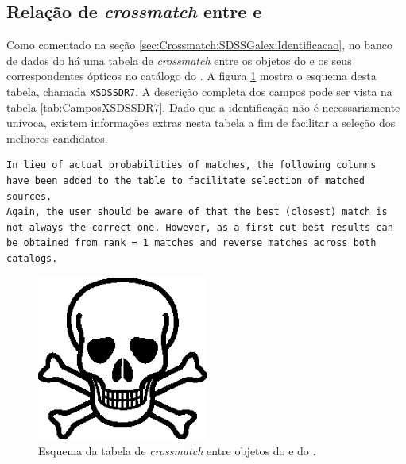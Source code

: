 \subsection{Relação de {\em crossmatch} entre \SDSS e \galex}
Como comentado na seção \ref{sec:Crossmatch:SDSSGalex:Identificacao}, no banco
de dados do \galex há uma tabela de {\em crossmatch} entre os objetos do \galex
e os seus correspondentes ópticos no catálogo do \SDSS. A figura
\ref{fig:TabelaxSDSSDR7} mostra o esquema desta tabela, chamada {\tt xSDSSDR7}.
A descrição completa dos campos pode ser vista na tabela
\ref{tab:CamposXSDSSDR7}. Dado que a identificação não é necessariamente
unívoca, existem informações extras nesta tabela a fim de facilitar a seleção
dos melhores candidatos.

\begin{verbatim}
In lieu of actual probabilities of matches, the following columns 
have been added to the table to facilitate selection of matched sources.
Again, the user should be aware of that the best (closest) match is 
not always the correct one. However, as a first cut best results can 
be obtained from rank = 1 matches and reverse matches across both 
catalogs.
\end{verbatim}



\begin{figure}
	\includegraphics[width=0.5\textwidth]{figuras/test.eps}
	\caption[Esquema da tabela de {em crossmatch} entre objetos do \galex e do
	\SDSS.]
	{Esquema da tabela de {\em crossmatch} entre objetos do \galex e do
	\SDSS.}
	\label{fig:TabelaxSDSSDR7}
\end{figure}

